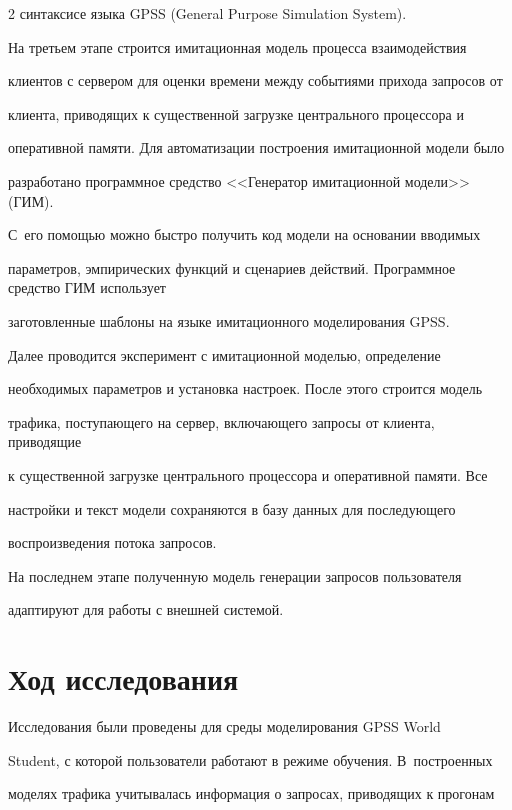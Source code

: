 \begin{multicols}{2}
синтаксисе языка {GPSS} (General Purpose Simulation System).

  

  На третьем этапе строится имитационная модель процесса взаимодействия 

клиентов с сервером для оценки времени между событиями прихода запросов от 

клиента, приводящих к существенной загрузке центрального процессора и 

оперативной памяти. Для автоматизации построения имитационной модели было 

разработано программное средство <<Генератор имитационной модели>> (ГИМ). 

С~его помощью можно быстро получить код модели на основании вводимых 

параметров, эмпирических функций и сценариев действий. Программное средство ГИМ использует 

заготовленные шаблоны на языке имитационного моделирования {GPSS}.

  

  Далее проводится эксперимент с имитационной моделью, определение 

необходимых параметров и установка настроек. После этого строится модель 

трафика, поступающего на сервер, включающего запросы от клиента, приводящие 

к существенной загрузке центрального процессора и оперативной памяти. Все 

настройки и текст модели сохраняются в базу данных для последующего 

воспроизведения потока запросов.

  

  На последнем этапе полученную модель генерации запросов пользователя 

адаптируют для работы с внешней системой. 



\section{Ход исследования}

  

  Исследования были проведены для среды моделирования GPSS World 

Student, с которой пользователи работают в режиме обучения. В~построенных 

моделях трафика учитывалась информация о запросах, приводящих к прогонам 


\end{multicols}
